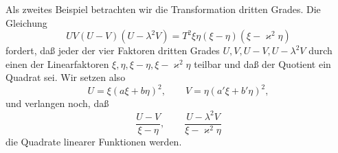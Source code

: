 \documentclass[11pt]{article}
\begin{document}
Als zweites Beispiel betrachten wir die Transformation dritten Grades. Die Gleichung
\begin{equation}
UV(U-V)(U-\lambda^2V)=T^2\xi\eta(\xi-\eta)(\xi-\varkappa^2\eta)
\tag{1}
\end{equation}
fordert, daß jeder der vier Faktoren dritten Grades $U,V,U-V,U-\lambda^2V$ durch einen der Linearfaktoren $\xi,\eta,\xi-\eta,\xi-\varkappa^2\eta$ teilbar und daß der Quotient ein Quadrat sei. Wir setzen also
\begin{equation}
U=\xi(a\xi+b\eta)^2,\qquad
V=\eta(a'\xi+b'\eta)^2,
\tag{2}
\end{equation}
und verlangen noch, daß
\begin{equation}
\frac{U-V}{\xi-\eta},\qquad
\frac{U-\lambda^2V}{\xi-\varkappa^2\eta}
\tag{3}
\end{equation}
die Quadrate linearer Funktionen werden.
\end{document}
